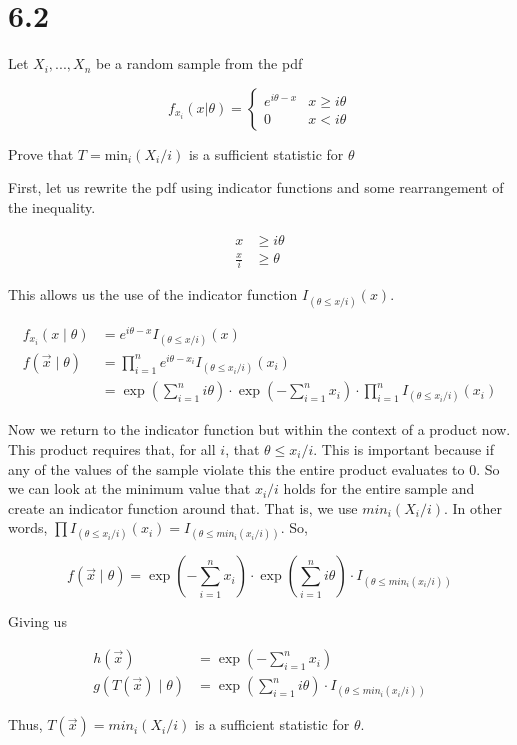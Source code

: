 \section*{6.2}

Let $X_i, ..., X_n$ be a random sample from the pdf

$$
f_{x_i}(x|\theta) = \begin{cases}
	e^{i\theta - x} & x \geq i\theta \\
	0 & x < i\theta
\end{cases}
$$

\noindent Prove that $T=\text{min}_i(X_i/i)$ is a sufficient statistic for $\theta$

First, let us rewrite the pdf using indicator functions and some rearrangement of the inequality.

\vspace{-5mm}
\begin{align*}
	x &\geq i\theta \\
	\frac{x}{i} &\geq \theta
\end{align*}
\vspace{-5mm}

This allows us the use of the indicator function $I_{(\theta \leq x/i)}(x)$. 

\begin{align*}
	f_{x_i}(x \mid \theta) &= e^{i\theta - x} I_{(\theta \leq x/i)}(x) \\
	f(\vec{x} \mid \theta) &= \prod_{i=1}^n e^{i\theta - x_i} I_{(\theta \leq x_i/i)}(x_i) \\
	&= \exp\left( \sum_{i=1}^n i\theta \right) \cdot \exp\left(-\sum_{i=1}^n x_i\right) \cdot \prod_{i=1}^n  I_{(\theta \leq x_i/i)}(x_i) 
\end{align*}

Now we return to the indicator function but within the context of a product now. This product requires that, for all $i$, that $\theta \leq x_i / i$. This is important because if any of the values of the sample violate this the entire product evaluates to 0. So we can look at the minimum value that $x_i / i$ holds for the entire sample and create an indicator function around that. That is, we use $min_i(X_i / i)$. In other words, $\prod I_{(\theta \leq x_i/i)}(x_i) =  I_{(\theta \leq min_i(x_i / i))}$. So,

\[
	f(\vec{x} \mid \theta) = \exp\left(-\sum_{i=1}^n x_i\right) \cdot \exp\left( \sum_{i=1}^n i\theta \right) \cdot I_{(\theta \leq min_i(x_i / i))}
\]

Giving us

\vspace{-5mm}
\begin{align*}
	h(\vec{x}) &= \exp\left(-\sum_{i=1}^n x_i\right) \\
	g(T(\vec{x}) \mid \theta) &= \exp\left( \sum_{i=1}^n i\theta \right) \cdot I_{(\theta \leq min_i(x_i / i))} 
\end{align*}

Thus, $T(\vec{x}) = min_i(X_i/i)$ is a sufficient statistic for $\theta$.
